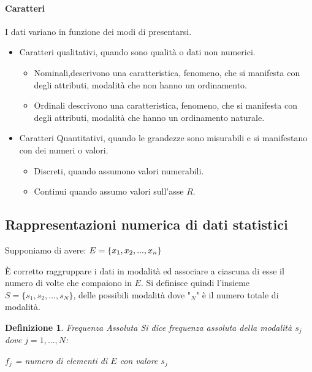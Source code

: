 \documentclass{article}
\newtheorem{definition}{Definizione}[section]
\begin{document}
    \paragraph{Caratteri} I dati variano in funzione dei modi di presentarsi.
    \begin{itemize}
        
        \item Caratteri qualitativi, quando sono qualità o dati non numerici.
        \begin{itemize}
            \item Nominali,descrivono una caratteristica, fenomeno, che si manifesta con degli attributi, modalità che non hanno un ordinamento.
            \item Ordinali descrivono una caratteristica, fenomeno, che si manifesta con degli attributi, modalità che hanno un ordinamento naturale.
        \end{itemize}
        \item Caratteri Quantitativi, quando le grandezze sono misurabili e si manifestano con dei numeri o valori.  
        \begin{itemize}
            \item Discreti, quando assumono valori numerabili.
            \item Continui quando assumo valori sull'asse $R$.
        \end{itemize}
        
    \end{itemize}
    

    \subsection{Rappresentazioni numerica di dati statistici}
    Supponiamo di avere: 
     $E= \{ x_1,x_2,...,x_n \}\\$ 
        
    È corretto raggruppare i dati in modalità ed associare a ciascuna di esse il numero di volte che compaiono in $E$. Si definisce quindi l'insieme
    $S=\{s_1,s_2,...,s_N\}$, delle possibili modalità dove "$_N$" è il numero totale di modalità.
    
    
    \begin{definition}{Frequenza Assoluta} 
    Si dice frequenza assoluta della modalità $s_j$ dove 
    $j = 1,...,N$: 
    
    $f_j$ = numero di elementi di $E$ con valore $s_j$
      \end{definition}
    
\end{document}
